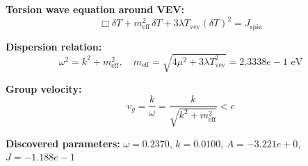 
\textbf{Torsion wave equation around VEV:}
\begin{equation}
  \Box \delta T + m_{\text{eff}}^2 \, \delta T + 3\lambda T_{\text{vev}} (\delta T)^2 = J_{\text{spin}}
\end{equation}

\textbf{Dispersion relation:}
\begin{equation}
  \omega^2 = k^2 + m_{\text{eff}}^2, \quad
  m_{\text{eff}} = \sqrt{4\mu^2 + 3\lambda T_{\text{vev}}^2} = 2.3338e-1 \text{ eV}
\end{equation}

\textbf{Group velocity:}
\begin{equation}
  v_g = \frac{k}{\omega} = \frac{k}{\sqrt{k^2 + m_{\text{eff}}^2}} < c
\end{equation}

\textbf{Discovered parameters:}
$\omega = 0.2370$, \quad
$k = 0.0100$, \quad
$A = -3.221e+0$, \quad
$J = -1.188e-1$